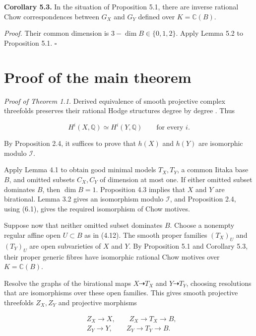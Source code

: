 \documentclass[11pt,a4paper]{article}
\begin{document}
\noindent \textbf{Corollary 5.3.} In the situation of Proposition 5.1, there are inverse rational Chow correspondences between $G_X$ and $G_Y$ defined over $K=\mathbb C(B)$.

\noindent \emph{Proof.} Their common dimension is $3-\dim B\in\{0,1,2\}$. Apply Lemma 5.2 to Proposition 5.1. $\square$

\section{Proof of the main theorem}

\emph{Proof of Theorem 1.1.} Derived equivalence of smooth projective complex threefolds preserves their rational Hodge structures degree by degree \cite[Theorem 2(a)]{ACMV19}. Thus

\begin{equation*}
H^i(X,\mathbb Q)\simeq H^i(Y,\mathbb Q)
\qquad\text{for every }i.
\tag{6.1}
\end{equation*}

By Proposition 2.4, it suffices to prove that $h(X)$ and $h(Y)$ are isomorphic modulo $\mathcal I$.

Apply Lemma 4.1 to obtain good minimal models $T_X,T_Y$, a common Iitaka base $B$, and omitted subsets $C_X,C_Y$ of dimension at most one. If either omitted subset dominates $B$, then $\dim B=1$. Proposition 4.3 implies that $X$ and $Y$ are birational. Lemma 3.2 gives an isomorphism modulo $\mathcal I$, and Proposition 2.4, using (6.1), gives the required isomorphism of Chow motives.

Suppose now that neither omitted subset dominates $B$. Choose a nonempty regular affine open $U\subset B$ as in (4.12). The smooth proper families $(T_X)_U$ and $(T_Y)_U$ are open subvarieties of $X$ and $Y$. By Proposition 5.1 and Corollary 5.3, their proper generic fibres have isomorphic rational Chow motives over $K=\mathbb C(B)$.

Resolve the graphs of the birational maps $X\dashrightarrow T_X$ and $Y\dashrightarrow T_Y$, choosing resolutions that are isomorphisms over these open families. This gives smooth projective threefolds $Z_X,Z_Y$ and projective morphisms

\begin{equation*}
\begin{aligned}
&Z_X\longrightarrow X,\qquad Z_X\longrightarrow T_X\longrightarrow B,\\
&Z_Y\longrightarrow Y,\qquad Z_Y\longrightarrow T_Y\longrightarrow B.
\end{aligned}
\end{equation*}
\end{document}
